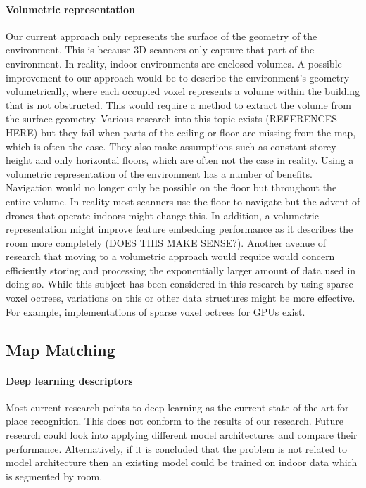 \paragraph{Volumetric representation}
Our current approach only represents the surface of the geometry of the environment. This is because 3D scanners only capture that part of the environment. In reality, indoor environments are enclosed volumes. A possible improvement to our approach would be to describe the environment's geometry volumetrically, where each occupied voxel represents a volume within the building that is not obstructed. This would require a method to extract the volume from the surface geometry. Various research into this topic exists (REFERENCES HERE) but they fail when parts of the ceiling or floor are missing from the map, which is often the case. They also make assumptions such as constant storey height and only horizontal floors, which are often not the case in reality. Using a volumetric representation of the environment has a number of benefits. Navigation would no longer only be possible on the floor but throughout the entire volume. In reality most scanners use the floor to navigate but the advent of drones that operate indoors might change this. In addition, a volumetric representation might improve feature embedding performance as it describes the room more completely (DOES THIS MAKE SENSE?). Another avenue of research that moving to a volumetric approach would require would concern efficiently storing and processing the exponentially larger amount of data used in doing so. While this subject has been considered in this research by using sparse voxel octrees, variations on this or other data structures might be more effective. For example, implementations of sparse voxel octrees for GPUs exist.

\subsection{Map Matching}

\paragraph{Deep learning descriptors}
Most current research points to deep learning as the current state of the art for place recognition. This does not conform to the results of our research. Future research could look into applying different model architectures and compare their performance. Alternatively, if it is concluded that the problem is not related to model architecture then an existing model could be trained on indoor data which is segmented by room.

